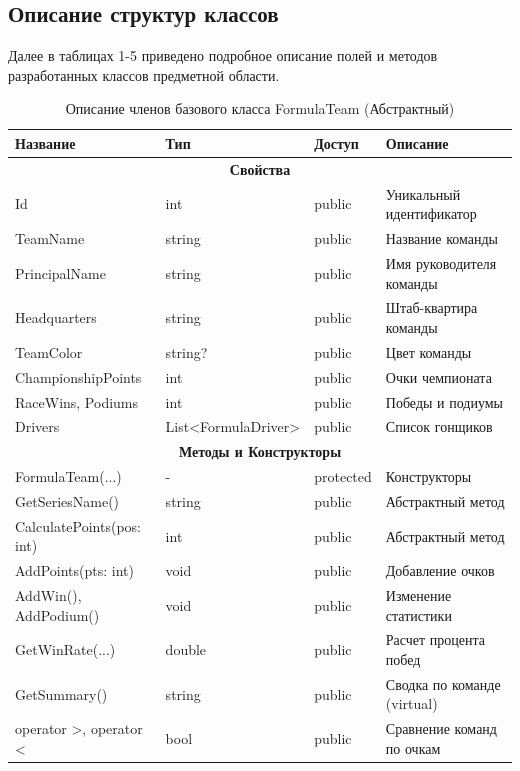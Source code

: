 \subsection*{Описание структур классов}

Далее в таблицах 1-5 приведено подробное описание полей и методов разработанных классов предметной области.

\begin{table}[H]
\centering
\caption{Описание членов базового класса FormulaTeam (Абстрактный)}
\begin{tabular}{|p{4.5cm}|p{3.5cm}|p{2cm}|p{5cm}|}
\hline
\textbf{Название} & \textbf{Тип} & \textbf{Доступ} & \textbf{Описание} \\ \hline
\multicolumn{4}{|c|}{\textbf{Свойства}} \\ \hline
Id & int & public & Уникальный идентификатор \\ \hline
TeamName & string & public & Название команды \\ \hline
PrincipalName & string & public & Имя руководителя команды \\ \hline
Headquarters & string & public & Штаб-квартира команды \\ \hline
TeamColor & string? & public & Цвет команды \\ \hline
ChampionshipPoints & int & public & Очки чемпионата \\ \hline
RaceWins, Podiums & int & public & Победы и подиумы \\ \hline
Drivers & {\footnotesize List<FormulaDriver>} & public & Список гонщиков \\ \hline
\multicolumn{4}{|c|}{\textbf{Методы и Конструкторы}} \\ \hline
FormulaTeam(...) & - & protected & Конструкторы \\ \hline
GetSeriesName() & string & public & Абстрактный метод \\ \hline
CalculatePoints(pos: int) & int & public & Абстрактный метод \\ \hline
AddPoints(pts: int) & void & public & Добавление очков \\ \hline
AddWin(), AddPodium() & void & public & Изменение статистики \\ \hline
GetWinRate(...) & double & public & Расчет процента побед \\ \hline
GetSummary() & string & public & Сводка по команде (virtual) \\ \hline
operator >, operator < & bool & public & Сравнение команд по очкам \\ \hline
\end{tabular}
\end{table}

